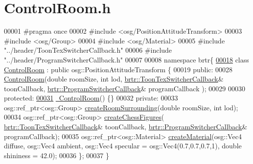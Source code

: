 \hypertarget{_control_room_8h_source}{\section{Control\+Room.\+h}
\label{_control_room_8h_source}
}

\begin{DoxyCode}
00001 \textcolor{preprocessor}{#pragma once}
00002 \textcolor{preprocessor}{#include <osg/PositionAttitudeTransform>}
00003 \textcolor{preprocessor}{#include <osg/Group>}
00004 \textcolor{preprocessor}{#include <osg/Material>}
00005 \textcolor{preprocessor}{#include "../header/ToonTexSwitcherCallback.h"}
00006 \textcolor{preprocessor}{#include "../header/ProgramSwitcherCallback.h"}
00007 
00008 \textcolor{keyword}{namespace }brtr\{
\hypertarget{_control_room_8h_source_l00018}{}\hyperlink{classbrtr_1_1_control_room}{00018}     \textcolor{keyword}{class }\hyperlink{classbrtr_1_1_control_room}{ControlRoom} : \textcolor{keyword}{public} osg::PositionAttitudeTransform \{
00019     \textcolor{keyword}{public}:
00028         \hyperlink{classbrtr_1_1_control_room_afb36cd27e18234098fbecd22ac325319}{ControlRoom}(\textcolor{keywordtype}{double} roomSize, \textcolor{keywordtype}{int} lod, 
      \hyperlink{classbrtr_1_1_toon_tex_switcher_callback}{brtr::ToonTexSwitcherCallback}& toonCallback, 
      \hyperlink{classbrtr_1_1_program_switcher_callback}{brtr::ProgramSwitcherCallback}& programCallback );
00029 
00030     \textcolor{keyword}{protected}:
\hypertarget{_control_room_8h_source_l00031}{}\hyperlink{classbrtr_1_1_control_room_a97b0eb95277b12a2267f8e7c777aeda2}{00031}         \hyperlink{classbrtr_1_1_control_room_a97b0eb95277b12a2267f8e7c777aeda2}{~ControlRoom}() \{\}
00032     \textcolor{keyword}{private}:
00033         osg::ref\_ptr<osg::Group> \hyperlink{classbrtr_1_1_control_room_a5dfafb496e18e8e4f6d792b144dd10b9}{createRoomSurrounding}(\textcolor{keywordtype}{double} roomSize, \textcolor{keywordtype}{int} lod);
00034         osg::ref\_ptr<osg::Group> \hyperlink{classbrtr_1_1_control_room_a15055ae530b811b7046871c5c1ef3f4f}{createChessFigures}(
      \hyperlink{classbrtr_1_1_toon_tex_switcher_callback}{brtr::ToonTexSwitcherCallback}& toonCallback, 
      \hyperlink{classbrtr_1_1_program_switcher_callback}{brtr::ProgramSwitcherCallback}& programCallback);
00035         osg::ref\_ptr<osg::Material> \hyperlink{classbrtr_1_1_control_room_a1cb8b6799fcb85750e0d321a4fbed6f1}{createMaterial}(osg::Vec4 diffuse, osg::Vec4 ambient, 
      osg::Vec4 specular = osg::Vec4(0.7,0.7,0.7,1), \textcolor{keywordtype}{double} shininess = 42.0);
00036     \};
00037 \}
\end{DoxyCode}
